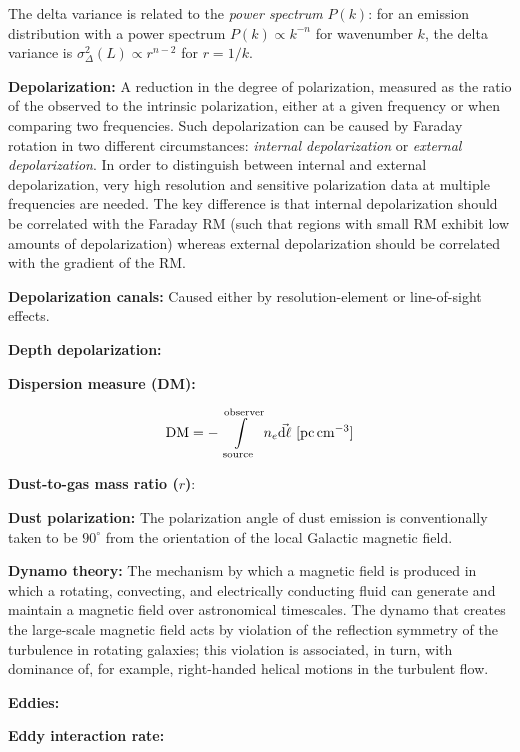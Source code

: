 \documentclass[a4paper,10pt]{article}
\begin{document}
{\noindent}The delta variance is related to the \textit{power spectrum} $P(k)$: for an emission distribution with a power spectrum $P(k)\propto k^{-n}$ for wavenumber $k$, the delta variance is $\sigma_\Delta^2(L)\propto r^{n-2}$ for $r=1/k$.

{\noindent}\textbf{Depolarization:} A reduction in the degree of polarization, measured as the ratio of the observed to the intrinsic polarization, either at a given frequency or when comparing two frequencies. Such depolarization can be caused by Faraday rotation in two different circumstances: \textit{internal depolarization} or \textit{external depolarization}. In order to distinguish between internal and external depolarization, very high resolution and sensitive polarization data at multiple frequencies are needed. The key difference is that internal depolarization should be correlated with the Faraday RM (such that regions with small RM exhibit low amounts of depolarization) whereas external depolarization should be correlated with the gradient of the RM.

{\noindent}\textbf{Depolarization canals:} Caused either by resolution-element or line-of-sight effects.

{\noindent}\textbf{Depth depolarization:}

{\noindent}\textbf{Dispersion measure (DM):}

\begin{align*}
    {\rm DM} = -\int\limits_\mathrm{source}^\mathrm{observer} n_e\vec{{\rm d}\ell} ~ [{\rm pc\,cm^{-3}}]
\end{align*}

{\noindent}\textbf{Dust-to-gas mass ratio ($r$)}: 

{\noindent}\textbf{Dust polarization:} The polarization angle of dust emission is conventionally taken to be $90^\circ$ from the orientation of the local Galactic magnetic field.

{\noindent}\textbf{Dynamo theory:} The mechanism by which a magnetic field is produced in which a rotating, convecting, and electrically conducting fluid can generate and maintain a magnetic field over astronomical timescales. The dynamo that creates the large-scale magnetic field acts by violation of the reflection symmetry of the turbulence in rotating galaxies; this violation is associated, in turn, with dominance of, for example, right-handed helical motions in the turbulent flow.

{\noindent}\textbf{Eddies:}

{\noindent}\textbf{Eddy interaction rate:}
\end{document}
